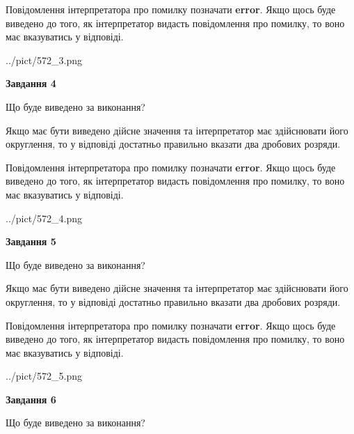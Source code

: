 \documentclass[12pt, ukrainian]{article}
\begin{document}
{\begin {Large}
Повідомлення інтерпретатора про помилку позначати \textbf{error}.
Якщо щось буде виведено до того, як інтерпретатор видасть повідомлення про помилку, 
то воно має вказуватись у відповіді. \par

\begin{center}
	{../pict/572_3.png}
\end{center}
\newpage

{\begin {center}\textbf{Завдання 4}\end {center}}\par
Що буде виведено за виконання? \par

Якщо має бути виведено дійсне значення та інтерпретатор має здійснювати його округлення, 
то у відповіді достатньо правильно вказати два дробових розряди.

Повідомлення інтерпретатора про помилку позначати \textbf{error}.
Якщо щось буде виведено до того, як інтерпретатор видасть повідомлення про помилку, 
то воно має вказуватись у відповіді. \par

\begin{center}
	{../pict/572_4.png}
\end{center}
\newpage

{\begin {center}\textbf{Завдання 5}\end {center}}\par
Що буде виведено за виконання? \par

Якщо має бути виведено дійсне значення та інтерпретатор має здійснювати його округлення, 
то у відповіді достатньо правильно вказати два дробових розряди.

Повідомлення інтерпретатора про помилку позначати \textbf{error}.
Якщо щось буде виведено до того, як інтерпретатор видасть повідомлення про помилку, 
то воно має вказуватись у відповіді. \par

\begin{center}
	{../pict/572_5.png}
\end{center}
\newpage

{\begin {center}\textbf{Завдання 6}\end {center}}\par
Що буде виведено за виконання? \par


\end{Large}}
\end{document}
